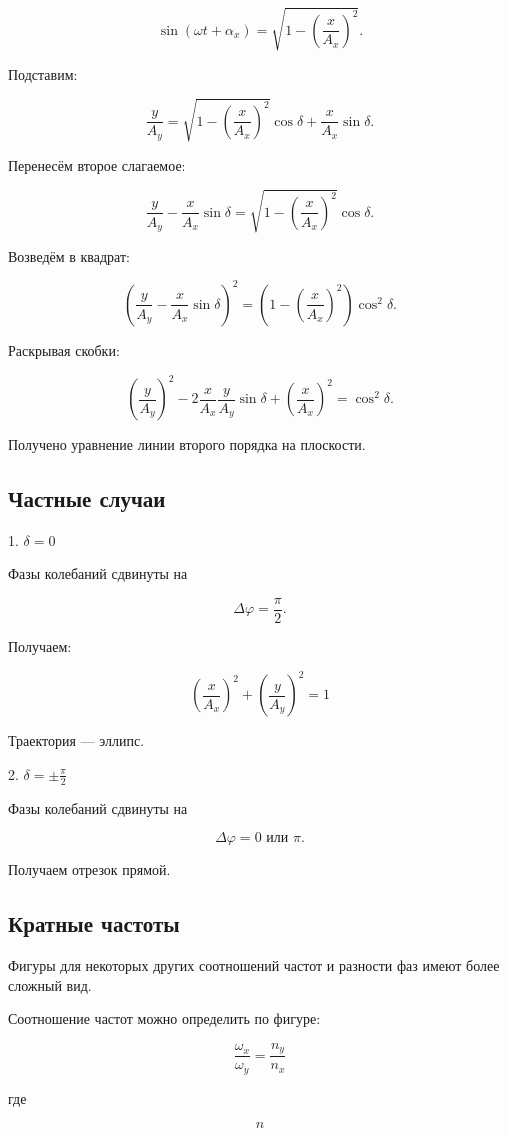 \documentclass[a4paper,12pt]{article}
\begin{document}
\[
\sin(\omega t + \alpha_x)
=
\sqrt{1-\left(\frac{x}{A_x}\right)^2}.
\]

Подставим:

\[
\frac{y}{A_y}
=
\sqrt{1-\left(\frac{x}{A_x}\right)^2}\cos\delta
+
\frac{x}{A_x}\sin\delta.
\]

Перенесём второе слагаемое:

\[
\frac{y}{A_y}
-
\frac{x}{A_x}\sin\delta
=
\sqrt{1-\left(\frac{x}{A_x}\right)^2}\cos\delta.
\]

Возведём в квадрат:

\[
\left(
\frac{y}{A_y}
-
\frac{x}{A_x}\sin\delta
\right)^2
=
\left(
1-\left(\frac{x}{A_x}\right)^2
\right)\cos^2\delta.
\]

Раскрывая скобки:

\[
\left(\frac{y}{A_y}\right)^2
-
2\frac{x}{A_x}\frac{y}{A_y}\sin\delta
+
\left(\frac{x}{A_x}\right)^2
=
\cos^2\delta.
\]

Получено уравнение линии второго порядка на плоскости.

\subsection*{Частные случаи}

1. $\delta = 0$

Фазы колебаний сдвинуты на

\[
\Delta\varphi=\frac{\pi}{2}.
\]

Получаем:

\[
\left(\frac{x}{A_x}\right)^2 + \left(\frac{y}{A_y}\right)^2 = 1
\]

Траектория — эллипс.

2. $\delta = \pm \frac{\pi}{2}$

Фазы колебаний сдвинуты на

\[
\Delta\varphi=0 \text{ или } \pi.
\]

Получаем отрезок прямой.

\subsection*{Кратные частоты}

Фигуры для некоторых других соотношений частот и разности фаз имеют более сложный вид.

Соотношение частот можно определить по фигуре:

\[
\frac{\omega_x}{\omega_y}=\frac{n_y}{n_x}
\]

где

\[
n
\]
\end{document}
